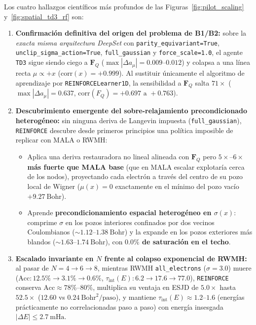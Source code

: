 \documentclass[10pt,a4paper]{article}
\begin{document}
Los cuatro hallazgos científicos más profundos de las Figuras~\ref{fig:pilot_scaling} y~\ref{fig:spatial_td3_rf} son:
\begin{enumerate}
\item \textbf{Confirmación definitiva del origen del problema de B1/B2:} sobre la \textit{exacta misma arquitectura DeepSet} con \texttt{parity\_equivariant=True}, \texttt{unclip\_sigma\_action=True}, \texttt{full\_gaussian} y \texttt{force\_scale=1.0}, el agente \texttt{TD3} sigue siendo ciego a $\bm{F}_Q$ ($\max|\Delta a_\mu| = 0.009\text{--}0.012$) y colapsa a una línea recta $\mu \propto +x$ ($\mathrm{corr}(x) = +0.999$). Al sustituir únicamente el algoritmo de aprendizaje por \texttt{REINFORCELearner1D}, la sensibilidad a $\bm{F}_Q$ salta \textbf{$71\times$} ($\max|\Delta a_\mu| = 0.637$, $\mathrm{corr}(F_Q) = +0.697\text{ a }+0.763$).
\item \textbf{Descubrimiento emergente del sobre-relajamiento precondicionado heterogéneo:} sin ninguna deriva de Langevin impuesta (\texttt{full\_gaussian}), \texttt{REINFORCE} descubre desde primeros principios una política imposible de replicar con MALA o RWMH:
\begin{itemize}
\item Aplica una deriva restauradora no lineal alineada con $\bm{F}_Q$ pero \textbf{$5\times\text{--}6\times$ más fuerte que MALA base} (que en MALA escalar explotaría cerca de los nodos), proyectando cada electrón a través del centro de su pozo local de Wigner ($\mu(x) = 0$ exactamente en el mínimo del pozo vacío $+9.27\ \mathrm{Bohr}$).
\item Aprende \textbf{precondicionamiento espacial heterogéneo en $\sigma(x)$}: comprime $\sigma$ en los pozos interiores confinados por dos vecinos Coulombianos ($\sim 1.12\text{--}1.38\ \mathrm{Bohr}$) y la expande en los pozos exteriores más blandos ($\sim 1.63\text{--}1.74\ \mathrm{Bohr}$), con \textbf{$0.0\%$ de saturación en el techo}.
\end{itemize}
\item \textbf{Escalado invariante en $N$ frente al colapso exponencial de RWMH:} al pasar de $N=4 \to 6 \to 8$, mientras RWMH \texttt{all\_electrons} ($\sigma=3.0$) muere ($\mathrm{Acc}: 12.5\% \to 3.1\% \to 0.6\%$, $\tau_{\mathrm{int}}(E): 6.2 \to 17.6 \to 77.0$), \texttt{REINFORCE} conserva $\mathrm{Acc} \approx 78\%\text{--}80\%$, multiplica su ventaja en ESJD de $5.0\times$ hasta \textbf{$52.5\times$} ($12.60$ vs $0.24\ \mathrm{Bohr}^2/\mathrm{paso}$), y mantiene $\tau_{\mathrm{int}}(E) \approx 1.2\text{--}1.6$ (energías prácticamente no correlacionadas paso a paso) con energía insesgada $|\Delta E| \le 2.7\ \mathrm{mHa}$.

\end{enumerate}
\end{document}
